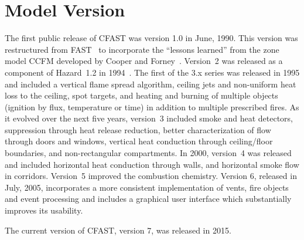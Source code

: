 \section{Model Version}

The first public release of CFAST was version 1.0 in June, 1990. This version was restructured from FAST~\cite{Models:FAST} to incorporate the ``lessons learned'' from the zone model CCFM developed by Cooper and Forney~\cite{Models:CCFM}. Version~2 was released as a component of Hazard~1.2 in 1994~\cite{Models:HAZARDI, Models:HAZARDI_12}. The first of the 3.x series was released in 1995 and included a vertical flame spread algorithm, ceiling jets and non-uniform heat loss to the ceiling, spot targets, and heating and burning of multiple objects (ignition by flux, temperature or time) in addition to multiple prescribed fires. As it evolved over the next five years, version~3 included smoke and heat detectors, suppression through heat release reduction, better characterization of flow through doors and windows, vertical heat conduction through ceiling/floor boundaries, and non-rectangular compartments. In 2000, version~4 was released and included horizontal heat conduction through walls, and horizontal smoke flow in corridors. Version~5 improved the combustion chemistry. Version 6, released in July, 2005, incorporates a more consistent implementation of vents, fire objects and event processing and includes a graphical user interface which substantially improves its usability.

The current version of CFAST, version 7, was released in 2015.
